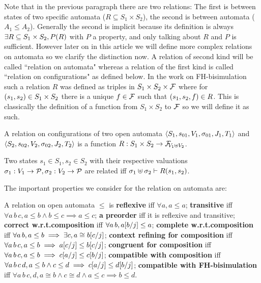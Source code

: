 \documentclass{article}
\begin{document}
Note that in the previous paragraph there are two relations:
The first is between states of two specific automata (\(R \subseteq S_1 \times S_2\)), the second is between automata (\(A_1 \leq A_2\)).
Generally the second is implicit because its definition is always \(\exists R \subseteq S_1 \times S_2, P\mpar{R}\) with \(P\) a property, and only talking about \(R\) and \(P\) is sufficient.
However later on in this article we will define more complex relations on automata so we clarify the distinction now.
A relation of second kind will be called ``relation on automata" whereas a relation of the first kind is called ``relation on configurations" as defined below.
In the work on FH-bisimulation \cite{henrio:01055091} such a relation \(R\) was defined as triples in \(S_1 \times S_2 \times \formulas\) where for \(\mpar{s_1, s_2} \in S_1 \times S_2\) there is a unique \(f \in \formulas\) such that \(\mpar{s_1, s_2, f} \in R\).
This is classically the definition of a function from \(S_1 \times S_2\) to \(\formulas\) so we will define it as such.
\begin{defi}
A relation on configurations of two open automata \(\OAg[1]\) and \(\OAg[2]\) is a function \(R: S_1 \times S_2 \to \rformulas[V_1 \uplus V_2]\).

Two states \(s_1 \in S_1, s_2 \in S_2\) with their respective valuations \(\sigma_1: V_1 \to \values, \sigma_2: V_2 \to \values\) are related iff \(\sigma_1 \uplus \sigma_2 \vdash R\mpar{s_1, s_2}\).
\end{defi}
The important properties we consider for the relation on automata are:
\begin{defi} A relation on open automata \(\leq\) is
 \textbf{reflexive} iff \(\forall a, a \leq a\);
 \textbf{transitive} iff \(\forall a\, b\, c, a \leq b \wedge b \leq c \implies a \leq c\);
 \textbf{a preorder} iff it is reflexive and transitive;
 \textbf{correct w.r.t.\@ composition} iff \(\forall a\, b, a\subst{b}{j} \leq a\);
 \textbf{complete w.r.t.\@ composition} iff \(\forall a\, b, a \leq b \implies \exists c, a \cong b\subst{c}{j}\);
 \textbf{context refining for composition} iff \(\forall a\, b\, c, a \leq b \implies a\subst{c}{j} \leq b\subst{c}{j}\);
 \textbf{congruent for composition} iff \(\forall a\, b\, c, a \leq b \implies c\subst{a}{j} \leq c\subst{b}{j}\);
 \textbf{compatible with composition} iff \(\forall a\, b\, c\, d, a \leq b \wedge c \leq d \implies c\subst{a}{j} \leq d\subst{b}{j}\);
 \textbf{compatible with FH-bisimulation} iff \(\forall a\, b\, c, d, a \cong b \wedge c \cong d \wedge a \leq c \implies b \leq d\).
\end{defi}
\end{document}
